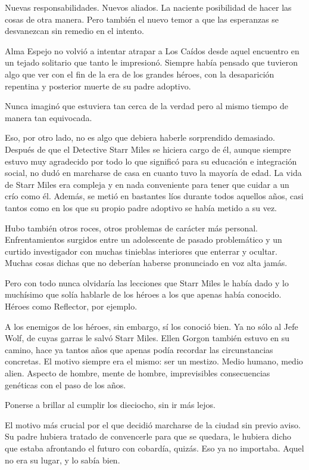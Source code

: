 Nuevas responsabilidades. Nuevos aliados. La naciente posibilidad de hacer las cosas de otra manera. Pero también el nuevo temor a que las esperanzas se desvanezcan sin remedio en el intento.

\fancyparbreak
Alma Espejo no volvió a intentar atrapar a Los Caídos desde aquel encuentro en un tejado solitario que tanto le impresionó. Siempre había pensado que tuvieron algo que ver con el fin de la era de los grandes héroes, con la desaparición repentina y posterior muerte de su padre adoptivo.

Nunca imaginó que estuviera tan cerca de la verdad pero al mismo tiempo de manera tan equivocada.

Eso, por otro lado, no es algo que debiera haberle sorprendido demasiado. Después de que el Detective Starr Miles se hiciera cargo de él, aunque siempre estuvo muy agradecido por todo lo que significó para su educación e integración social, no dudó en marcharse de casa en cuanto tuvo la mayoría de edad. La vida de Starr Miles era compleja y en nada conveniente para tener que cuidar a un crío como él. Además, se metió en bastantes líos durante todos aquellos años, casi tantos como en los que su propio padre adoptivo se había metido a su vez.

Hubo también otros roces, otros problemas de carácter más personal. Enfrentamientos surgidos entre un adolescente de pasado problemático y un curtido investigador con muchas tinieblas interiores que enterrar y ocultar. Muchas cosas dichas que no deberían haberse pronunciado en voz alta jamás.

Pero con todo nunca olvidaría las lecciones que Starr Miles le había dado y lo muchísimo que solía hablarle de los héroes a los que apenas había conocido. Héroes como Reflector, por ejemplo.

A los enemigos de los héroes, sin embargo, sí los conoció bien. Ya no sólo al Jefe Wolf, de cuyas garras le salvó Starr Miles. Ellen Gorgon también estuvo en su camino, hace ya tantos años que apenas podía recordar las circunstancias concretas. El motivo siempre era el mismo: ser un mestizo. Medio humano, medio alien. Aspecto de hombre, mente de hombre, imprevisibles consecuencias genéticas con el paso de los años.

Ponerse a brillar al cumplir los dieciocho, sin ir más lejos.

El motivo más crucial por el que decidió marcharse de la ciudad sin previo aviso. Su padre hubiera tratado de convencerle para que se quedara, le hubiera dicho que estaba afrontando el futuro con cobardía, quizás. Eso ya no importaba. Aquel no era su lugar, y lo sabía bien.


